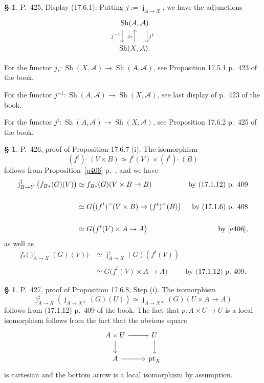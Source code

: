 \documentclass[12pt]{article}
\theoremstyle{remark}
\theoremstyle{definition}
\newtheorem{s}[thm]{\S}
\newcommand{\oo}{\operatorname}
\newcommand{\A}{\mathcal A}
\newcommand{\fthat}{(f^t)\ \widehat{}\ }
\begin{document}
% 

\begin{s} 
P.~425, Display (17.6.1): Putting $j:=\oo j_{A\to X}$, we have the adjunctions 
$$
\begin{tikzcd}
\oo{Sh}(A,\A)\ar[xshift=-4ex]{d}[swap]{j^{-1}}\ar[xshift=4ex]{d}{j^\ddagger}\\ 
\oo{Sh}(X,\A).\ar{u}{j_*}
\end{tikzcd}
$$ 

For the functor $j_*:\oo{Sh}(X,\A)\to\oo{Sh}(A,\A)$, see Proposition 17.5.1 p.~423 of the book. 

For the functor $j^{-1}:\oo{Sh}(A,\A)\to\oo{Sh}(X,\A)$, see last display of p.~423 of the book. 

For the functor $j^\ddagger:\oo{Sh}(A,\A)\to\oo{Sh}(X,\A)$, see Proposition 17.6.2 p.~425 of the book.
\end{s}

%

\begin{s} 
P.~426, proof of Proposition 17.6.7 (i). The isomorphism 
\begin{equation}\label{e406}
\fthat(V\times B)\simeq f^t(V)\times\fthat(B)
\end{equation} 
follows from Proposition~\ref{p406} p.~\pageref{p406}, and we have 
\begin{align*} 
%
\oo j_{B\to Y}^\ddagger\big(f_{B*}(G)(V)\big)&\simeq f_{B*}(G)(V\times B\to B)&\text{by (17.1.12) p. 409}\\ \\ 
%
&\simeq G\big(\fthat(V\times B)\to\fthat(B)\big)&\text{by (17.1.6) p. 408}\\ \\ 
%
&\simeq G\big(f^t(V)\times A\to A\big)&\text{by \eqref{e406}}, 
% 
\end{align*} 
as well as 
\begin{align*} 
%
f_*\big(\oo j_{A\to X}^\ddagger(G)(V)\big)&\simeq\oo j_{A\to X}^\ddagger(G)(f^t(V))\\ \\ 
%
&\simeq G\big(f^t(V)\times A\to A\big)&\text{by (17.1.12) p. 409}. 
% 
\end{align*}  
\end{s} 

% 

\begin{s}\label{1768}
P.~427, proof of Proposition 17.6.8, Step (i). The isomorphism 
$$
\oo j_{A\to X}^\ddagger(\oo j_{A\to X*}(G)(U))\simeq\oo j_{A\to X*}(G)(U\times A\to A)
$$ 
follows from (17.1.12) p.~409 of the book. The fact that $p:A\times U\to U$ is a local isomorphism follows from the fact that the obvious square 
$$
\begin{tikzcd} 
A\times U\ar{r}\ar{d}&U\ar{d}\\ 
A\ar{r}&\oo{pt}_X
\end{tikzcd}
$$ 
is cartesian and the bottom arrow is a local isomorphism by assumption. 
\end{s} 
\end{document}
